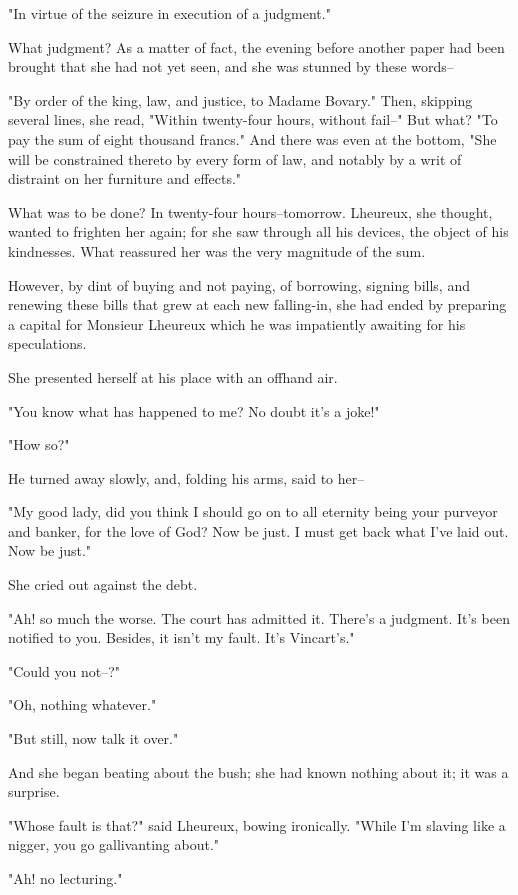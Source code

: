 \documentclass{tufte-book}
\begin{document}
"In virtue of the seizure in execution of a judgment."

What judgment? As a matter of fact, the evening before another paper
had been brought that she had not yet seen, and she was stunned by these
words--

"By order of the king, law, and justice, to Madame Bovary." Then,
skipping several lines, she read, "Within twenty-four hours, without
fail--" But what? "To pay the sum of eight thousand francs." And there
was even at the bottom, "She will be constrained thereto by every
form of law, and notably by a writ of distraint on her furniture and
effects."

What was to be done? In twenty-four hours--tomorrow. Lheureux, she
thought, wanted to frighten her again; for she saw through all his
devices, the object of his kindnesses. What reassured her was the very
magnitude of the sum.

However, by dint of buying and not paying, of borrowing, signing bills,
and renewing these bills that grew at each new falling-in, she had ended
by preparing a capital for Monsieur Lheureux which he was impatiently
awaiting for his speculations.

She presented herself at his place with an offhand air.

"You know what has happened to me? No doubt it's a joke!"

"How so?"

He turned away slowly, and, folding his arms, said to her--

"My good lady, did you think I should go on to all eternity being your
purveyor and banker, for the love of God? Now be just. I must get back
what I've laid out. Now be just."

She cried out against the debt.

"Ah! so much the worse. The court has admitted it. There's a judgment.
It's been notified to you. Besides, it isn't my fault. It's Vincart's."

"Could you not--?"

"Oh, nothing whatever."

"But still, now talk it over."

And she began beating about the bush; she had known nothing about it; it
was a surprise.

"Whose fault is that?" said Lheureux, bowing ironically. "While I'm
slaving like a nigger, you go gallivanting about."

"Ah! no lecturing."
\end{document}
